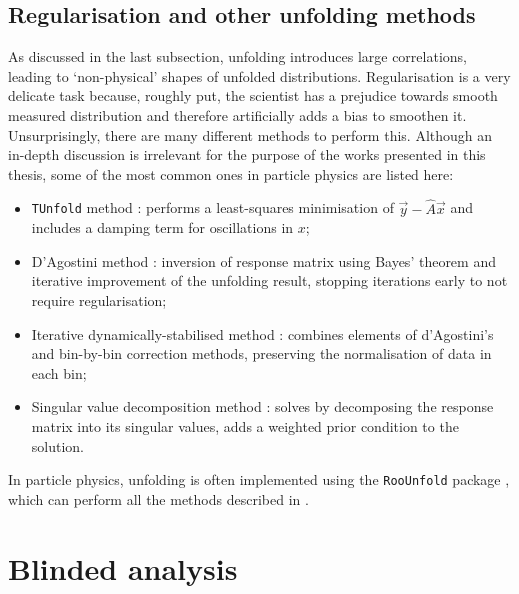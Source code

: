 \subsection{Regularisation and other unfolding methods}
As discussed in the last subsection, unfolding introduces large correlations, leading to `non-physical' shapes of unfolded distributions.
Regularisation is a very delicate task because, roughly put, the scientist has a prejudice towards smooth measured distribution and therefore artificially adds a bias to smoothen it.
Unsurprisingly, there are many different methods to perform this.
Although an in-depth discussion is irrelevant for the purpose of the works presented in this thesis, some of the most common ones in particle physics are listed here:
\begin{itemize}
    \item \texttt{TUnfold} method \cite{Schmitt:2012kp}: performs a least-squares minimisation of $\vec{y}-\hat{A}{\vec{x}}$ and includes a damping term for oscillations in $x$;
    \item D'Agostini method \cite{d2010improved,DAgostini:1994fjx}: inversion of response matrix using Bayes' theorem and iterative improvement of the unfolding result, stopping iterations early to not require regularisation;
    \item Iterative dynamically-stabilised method \cite{Malaescu:2009dm}: combines elements of d'Agostini's and bin-by-bin correction methods, preserving the normalisation of data in each bin;
    \item Singular value decomposition method \cite{Hocker:1995kb}: solves  by decomposing the response matrix into its singular values, adds a weighted prior condition to the solution.
\end{itemize}
In particle physics, unfolding is often implemented using the \texttt{RooUnfold} package \cite{Brenner:2019lmf}, which can perform all the methods described in .

\section{Blinded analysis}\label{sec:blinding}

